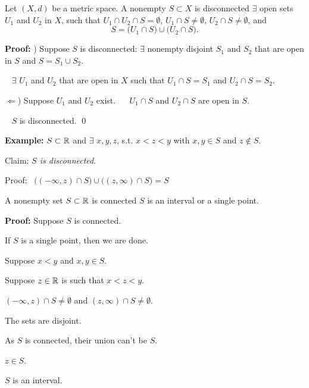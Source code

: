 \documentclass[10pt,aspectratio=169]{beamer}
\begin{document}
\begin{frame}

\begin{proposition}
Let $(X,d)$ be a metric space.
\pause
A nonempty $S \subset X$ is disconnected \wiffif
$\exists$ open sets $U_1$ and
$U_2$ in $X$, such that $U_1 \cap U_2 \cap S = \emptyset$,
$U_1 \cap S \not= \emptyset$,
$U_2 \cap S \not= \emptyset$, and
\vspace*{-6pt}
\begin{equation*}
S = 
\bigl( U_1 \cap S \bigr)
\cup
\bigl( U_2 \cap S \bigr) .
\end{equation*}
\end{proposition}

\pause
\begin{center}
\end{center}

\pause
\textbf{Proof:}
\thus)
Suppose $S$ is disconnected:
\pause
$\exists$
nonempty disjoint $S_1$ and $S_2$ that are
open in $S$ and $S = S_1 \cup S_2$.

\pause
\thus~ $\exists$ $U_1$ and $U_2$
that are open in $X$ such that $U_1 \cap S = S_1$ and
$U_2 \cap S = S_2$.

\pause
$\Leftarrow$)
Suppose $U_1$ and $U_2$ exist.
\pause
~\thus~ $U_1 \cap S$ and $U_2 \cap S$ are open in $S$.

\pause
\thus~ $S$ is disconnected.
\qed

\pause
\medskip

\textbf{Example:}
$S \subset {\mathbb{R}}$ and $\exists$ $x,y,z$, s.t.  $x < z < y$ with $x,y \in S$
and $z \notin S$.

\pause
Claim: \emph{$S$ is disconnected}.

\pause
Proof:
~$
\bigl( (-\infty,z) \cap S \bigr)
\cup
\bigl( (z,\infty) \cap S \bigr)
= S$

\end{frame}

\begin{frame}

\begin{proposition}
A nonempty set $S \subset {\mathbb{R}}$ is connected \wiffif $S$ is
an interval or a single point.
\end{proposition}

\pause
\textbf{Proof:}
Suppose $S$ is connected.

\pause
\medskip

If $S$ is a single point, then we are done.

\pause
\medskip

Suppose $x < y$ and $x,y \in S$.

\pause
Suppose $z \in {\mathbb{R}}$ is such that $x < z < y$.

\pause
$(-\infty,z) \cap S \not= \emptyset$ and $(z,\infty) \cap S \not=
\emptyset$.

\pause
The sets are disjoint.

\pause
As $S$ is connected, their union can't be $S$.

\pause
\thus \quad $z \in S$.

\pause
\thus \quad $S$ is an interval.

\end{frame}
\end{document}
